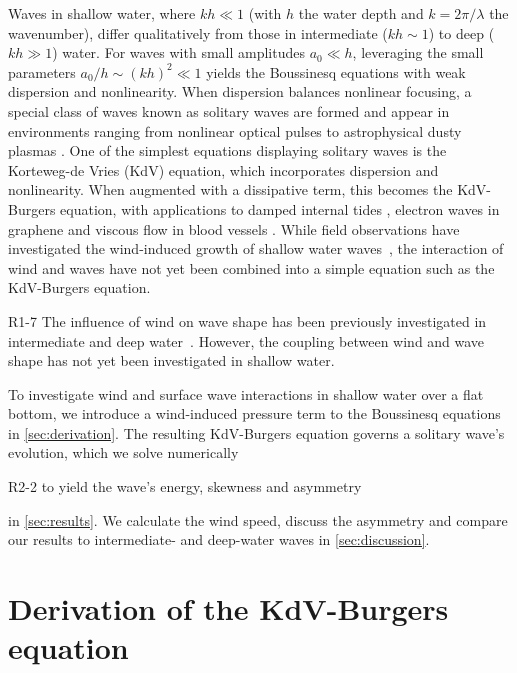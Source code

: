 \documentclass{jfm}
\begin{document}
Waves in shallow water, where $kh \ll 1$ (with $h$ the water depth and
$k=2\pi/\lambda$ the wavenumber), differ qualitatively from those in
intermediate ($kh \sim 1$) to deep ($kh \gg 1$) water.
For waves with small amplitudes $a_0 \ll h$,
leveraging the small parameters $a_0/h \sim (kh)^2 \ll 1$
yields the Boussinesq equations with weak dispersion and nonlinearity.
When dispersion balances nonlinear
focusing, a special class of waves known as solitary waves are formed
and appear in environments ranging from nonlinear optical pulses
\citep[\eg][]{kivshar1993dark} to astrophysical dusty plasmas
\citep[\eg][]{sahu2012nonextensive}.
One of the simplest equations displaying solitary waves is the
Korteweg-de Vries (KdV) equation, which incorporates dispersion and
nonlinearity.
When augmented with a dissipative term, this becomes the KdV-Burgers
equation, with applications to damped internal tides
\citep[\eg][]{sandstrom1995dissipation}, electron waves in graphene
\citep[\eg][]{zdyrski2019effects} and viscous flow in blood vessels
\citep[\eg][]{antar1999weakly}.
While field observations have investigated the wind-induced growth of
shallow water waves~\citep[\eg][]{cavaleri1981wind}, the interaction of
wind and waves have not yet been combined into a simple equation such as
the KdV-Burgers equation.

\begin{LineLabel}{R1-7}
The influence of wind on wave shape has been previously investigated in
intermediate and deep water~\citep{zdyrski2020wind}.
However, the coupling between wind and wave shape has not yet been
investigated in shallow water.
\end{LineLabel}
To investigate wind and surface wave interactions in shallow water over
a flat bottom, we introduce a wind-induced pressure term to the
Boussinesq equations in \cref{sec:derivation}.
The resulting KdV-Burgers equation governs a solitary wave's evolution,
which we solve numerically
\begin{LineLabel}{R2-2}
to yield the wave's energy, skewness and asymmetry
\end{LineLabel}
in \cref{sec:results}.
We calculate the wind speed, discuss the asymmetry and
compare our results to intermediate- and deep-water waves in
\cref{sec:discussion}.

\section{\label{sec:derivation} Derivation of the KdV-Burgers equation}
\end{document}
